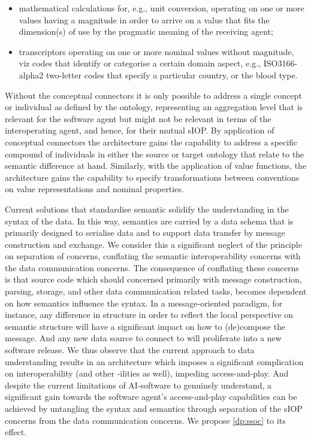 \documentclass[sort&compress,preprint,authoryear,3p,twocolumn]{elsarticle}
\providecommand{\tightlist}{%
  \setlength{\itemsep}{0pt}\setlength{\parskip}{0pt}}
\begin{document}
\begin{itemize}
\begin{itemize}
    \begin{itemize}
    \tightlist
    \item
      mathematical calculations for, e.g., unit conversion, operating on
      one or more values having a magnitude in order to arrive on a
      value that fits the dimension(s) of use by the pragmatic meaning
      of the receiving agent;
    \item
      transcriptors operating on one or more nominal values without
      magnitude, viz codes that identify or categorise a certain domain
      aspect, e.g., ISO3166-alpha2 two-letter codes that specify a
      particular country, or the blood type.
    \end{itemize}
  \end{itemize}
\end{itemize}

Without the conceptual connectors it is only possible to address a
single concept or individual as defined by the ontology, representing an
aggregation level that is relevant for the software agent but might not
be relevant in terms of the interoperating agent, and hence, for their
mutual sIOP. By application of conceptual connectors the architecture
gains the capability to address a specific compound of individuals in
either the source or target ontology that relate to the semantic
difference at hand. Similarly, with the application of value functions,
the architecture gains the capability to specify transformations between
conventions on value representations and nominal properties.

Current solutions that standardise semantic solidify the understanding
in the syntax of the data. In this way, semantics are carried by a data
schema that is primarily designed to serialise data and to support data
transfer by message construction and exchange. We consider this a
significant neglect of the principle on separation of concerns,
conflating the semantic interoperability concerns with the data
communication concerns. The consequence of conflating these concerns is
that source code which should concerned primarily with message
construction, parsing, storage, and other data communication related
tasks, becomes dependent on how semantics influence the syntax. In a
message-oriented paradigm, for instance, any difference in structure in
order to reflect the local perspective on semantic structure will have a
significant impact on how to (de)compose the message. And any new data
source to connect to will proliferate into a new software release. We
thus observe that the current approach to data understanding results in
an architecture which imposes a significant complication on
interoperability (and other -ilities as well), impeding access-and-play.
And despite the current limitations of AI-software to genuinely
understand, a significant gain towards the software agent's
access-and-play capabilities can be achieved by untangling the syntax
and semantics through separation of the sIOP concerns from the data
communication concerns. We propose \cref{dp:ssoc} to its effect.
\end{document}
